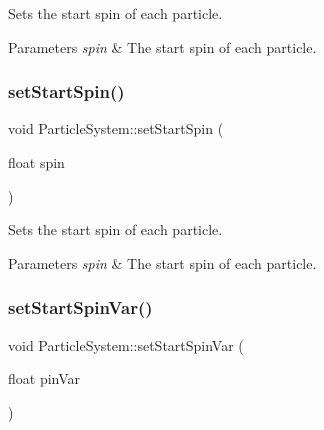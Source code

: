 Sets the start spin of each particle.


\begin{DoxyParams}{Parameters}
{\em spin} & The start spin of each particle. \\
\hline
\end{DoxyParams}
\mbox{\label{classParticleSystem_a2a6b02e437565c2dcc70d237c7c1c23a}} 
\subsubsection{\texorpdfstring{set\+Start\+Spin()}{setStartSpin()}\hspace{0.1cm}{\footnotesize\ttfamily [2/2]}}
{\footnotesize\ttfamily void Particle\+System\+::set\+Start\+Spin (\begin{DoxyParamCaption}\item[{float}]{spin }\end{DoxyParamCaption})\hspace{0.3cm}{\ttfamily [inline]}}

Sets the start spin of each particle.


\begin{DoxyParams}{Parameters}
{\em spin} & The start spin of each particle. \\
\hline
\end{DoxyParams}
\mbox{\label{classParticleSystem_a3aff3de1fe852501893966352c7ccd37}} 
\subsubsection{\texorpdfstring{set\+Start\+Spin\+Var()}{setStartSpinVar()}\hspace{0.1cm}{\footnotesize\ttfamily [1/2]}}
{\footnotesize\ttfamily void Particle\+System\+::set\+Start\+Spin\+Var (\begin{DoxyParamCaption}\item[{float}]{pin\+Var }\end{DoxyParamCaption})\hspace{0.3cm}{\ttfamily [inline]}}

